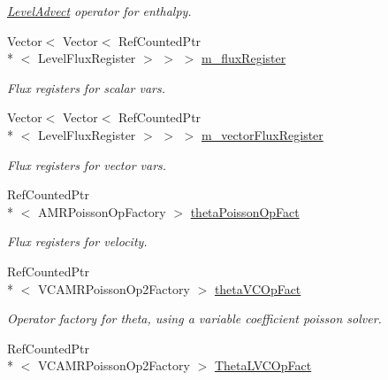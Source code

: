 \begin{DoxyCompactItemize}
\begin{DoxyCompactList}\small\item\em \hyperlink{class_level_advect}{Level\-Advect} operator for enthalpy. \end{DoxyCompactList}\item 
Vector$<$ Vector$<$ Ref\-Counted\-Ptr\\*
$<$ Level\-Flux\-Register $>$ $>$ $>$ \hyperlink{classamr_mushy_layer_a012cf527ccae6d0b358f1a9cd9ef2a50}{m\-\_\-flux\-Register}
\begin{DoxyCompactList}\small\item\em Flux registers for scalar vars. \end{DoxyCompactList}\item 
Vector$<$ Vector$<$ Ref\-Counted\-Ptr\\*
$<$ Level\-Flux\-Register $>$ $>$ $>$ \hyperlink{classamr_mushy_layer_ab8be3498c90ee0be2b448e479239126d}{m\-\_\-vector\-Flux\-Register}
\begin{DoxyCompactList}\small\item\em Flux registers for vector vars. \end{DoxyCompactList}\item 
Ref\-Counted\-Ptr\\*
$<$ A\-M\-R\-Poisson\-Op\-Factory $>$ \hyperlink{classamr_mushy_layer_abcd65730bc3f80c5b274ab3249d74cb6}{theta\-Poisson\-Op\-Fact}
\begin{DoxyCompactList}\small\item\em Flux registers for velocity. \end{DoxyCompactList}\item 
\hypertarget{classamr_mushy_layer_afda9b6a05d586a2e82090dc6b783ecb1}{Ref\-Counted\-Ptr\\*
$<$ V\-C\-A\-M\-R\-Poisson\-Op2\-Factory $>$ \hyperlink{classamr_mushy_layer_afda9b6a05d586a2e82090dc6b783ecb1}{theta\-V\-C\-Op\-Fact}}\label{classamr_mushy_layer_afda9b6a05d586a2e82090dc6b783ecb1}

\begin{DoxyCompactList}\small\item\em Operator factory for theta, using a variable coefficient poisson solver. \end{DoxyCompactList}\item 
\hypertarget{classamr_mushy_layer_a2db54086f5a1ee11301430017f425b72}{Ref\-Counted\-Ptr\\*
$<$ V\-C\-A\-M\-R\-Poisson\-Op2\-Factory $>$ \hyperlink{classamr_mushy_layer_a2db54086f5a1ee11301430017f425b72}{Theta\-L\-V\-C\-Op\-Fact}}\label{classamr_mushy_layer_a2db54086f5a1ee11301430017f425b72}


\end{DoxyCompactItemize}
